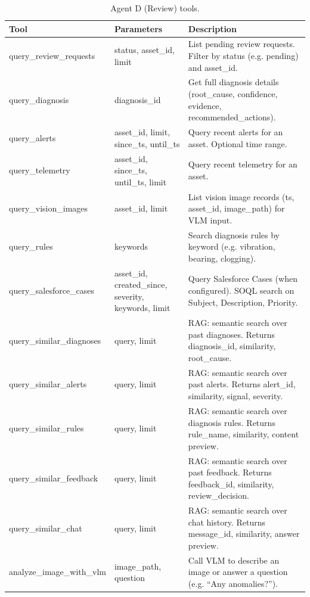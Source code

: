 \documentclass[12pt,letterpaper]{report}
\begin{document}
\begin{table}[htbp]
\centering
\caption{Agent D (Review) tools.}
\label{tab:agentd_tools}
\small
\begin{tabular}{llp{5.2cm}}
\toprule
\textbf{Tool} & \textbf{Parameters} & \textbf{Description} \\
\midrule
query\_review\_requests & status, asset\_id, limit & List pending review requests. Filter by status (e.g. pending) and asset\_id. \\
\addlinespace
query\_diagnosis & diagnosis\_id & Get full diagnosis details (root\_cause, confidence, evidence, recommended\_actions). \\
\addlinespace
query\_alerts & asset\_id, limit, since\_ts, until\_ts & Query recent alerts for an asset. Optional time range. \\
\addlinespace
query\_telemetry & asset\_id, since\_ts, until\_ts, limit & Query recent telemetry for an asset. \\
\addlinespace
query\_vision\_images & asset\_id, limit & List vision image records (ts, asset\_id, image\_path) for VLM input. \\
\addlinespace
query\_rules & keywords & Search diagnosis rules by keyword (e.g. vibration, bearing, clogging). \\
\addlinespace
query\_salesforce\_cases & asset\_id, created\_since, severity, keywords, limit & Query Salesforce Cases (when configured). SOQL search on Subject, Description, Priority. \\
\addlinespace
query\_similar\_diagnoses & query, limit & RAG: semantic search over past diagnoses. Returns diagnosis\_id, similarity, root\_cause. \\
\addlinespace
query\_similar\_alerts & query, limit & RAG: semantic search over past alerts. Returns alert\_id, similarity, signal, severity. \\
\addlinespace
query\_similar\_rules & query, limit & RAG: semantic search over diagnosis rules. Returns rule\_name, similarity, content preview. \\
\addlinespace
query\_similar\_feedback & query, limit & RAG: semantic search over past feedback. Returns feedback\_id, similarity, review\_decision. \\
\addlinespace
query\_similar\_chat & query, limit & RAG: semantic search over chat history. Returns message\_id, similarity, answer preview. \\
\addlinespace
analyze\_image\_with\_vlm & image\_path, question & Call VLM to describe an image or answer a question (e.g. ``Any anomalies?''). \\
\bottomrule
\end{tabular}
\end{table}
\end{document}
